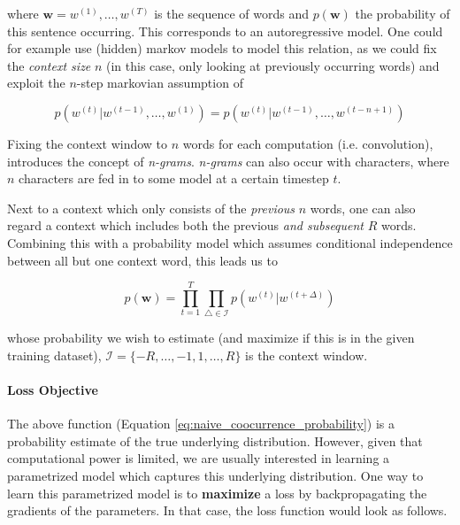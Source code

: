 \documentclass[a4paper,12pt,twoside,openright]{report}
\begin{document}
where $\mathbf{w} = w^{(1)}, \dots, w^{(T)} $ is the sequence of words and $p(\mathbf{w})$ the probability of this sentence occurring.
This corresponds to an autoregressive model.
One could for example use (hidden) markov models to model this relation, as we could fix the \textit{context size} $n$ (in this case, only looking at previously occurring words) and exploit the $n$-step markovian assumption of

\begin{equation}
p\left( w^{(t)} | w^{(t -1)}, \ldots, w^{(1)} \right) = p\left( w^{(t)} | w^{(t -1)}, \ldots, w^{(t - n + 1)} \right)
\end{equation}\label{eq:naive_sequential_probability_markovian}

Fixing the context window to $n$ words for each computation (i.e. convolution), introduces the concept of \textit{n-grams}. 
\textit{n-grams} can also occur with characters, where $n$ characters are fed in to some model at a certain timestep $t$.

Next to a context which only consists of the \textit{previous} $n$ words, one can also regard a context which includes both the previous \textit{and subsequent} $R$ words. 
Combining this with a probability model which assumes conditional independence between all but one context word, this leads us to

\begin{equation}
p(\mathbf{w})=\prod_{t=1}^{T} \prod_{\triangle \in \mathcal{I} } p\left( w^{(t)} | w^{(t +\Delta)}\right)
\label{eq:naive_coocurrence_probability}
\end{equation}

whose probability we wish to estimate (and maximize if this is in the given training dataset), $\mathcal{I}=\{-R, \ldots,-1,1, \ldots, R\}$ is the context window. 

\paragraph{Loss Objective} The above function (Equation \eqref{eq:naive_coocurrence_probability}) is a probability estimate of the true underlying distribution.
However, given that computational power is limited, we are usually interested in learning a parametrized model which captures this underlying distribution.
One way to learn this parametrized model is to \textbf{maximize} a loss by backpropagating the gradients of the parameters.
In that case, the loss function would look as follows.
\end{document}
